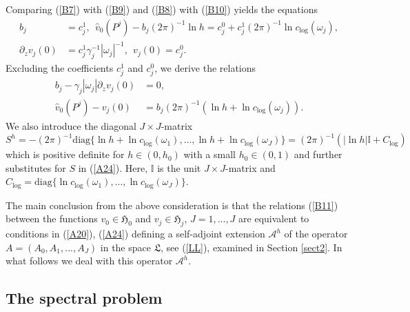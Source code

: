\documentclass[11pt]{article}%
\numberwithin{equation}{section}
\begin{document}
Comparing (\ref{B7}) with (\ref{B9}) and (\ref{B8}) with (\ref{B10}) yields
the equations%
\begin{align}
b_{j}  &  =c_{j}^{1},\ \ \widehat{v}_{0}(P^{j})-b_{j}(2\pi)^{-1}\ln
h=c_{j}^{0}+c_{j}^{1}(2\pi)^{-1}\ln c_{\log}\left(  \omega_{j}\right)
,\label{BBB}\\
\partial_{z}v_{j}(0)  &  =c_{j}^{1}\gamma_{j}^{-1}|\omega_{j}|^{-1}%
,\ \ v_{j}(0)=c_{j}^{0}.\nonumber
\end{align}
Excluding the coefficients $c_{j}^{1}$ and $c_{j}^{0}$, we derive the
relations%
\begin{align}
b_{j}-\gamma_{j}|\omega_{j}|\partial_{z}v_{j}(0)  &  =0,\label{B11}\\
\widehat{v}_{0}(P^{j})-v_{j}(0)  &  =b_{j}(2\pi)^{-1}(\ln h+\ln c_{\log
}\left(  \omega_{j}\right)  ).\nonumber
\end{align}
We also introduce the diagonal $J\times J$-matrix%
\begin{equation}
S^{h}=-(2\pi)^{-1}\mathrm{diag}\{\ln h+\ln c_{\log}\left(  \omega_{1}\right)
,...,\ln h+\ln c_{\log}\left(  \omega_{J}\right)  \}=(2\pi)^{-1}(|\ln
h|\mathbb{I}+C_{\log}) \label{B12}%
\end{equation}
which is positive definite for $h\in(0,h_{0})$ with a small $h_{0}\in(0,1)$
and further substitutes for $S$ in (\ref{A24}). Here, $\mathbb{I}$ is the unit
$J\times J$-matrix and $C_{\log}=\mathrm{diag}\{\ln c_{\log}\left(  \omega
_{1}\right)  ,...,\ln c_{\log}\left(  \omega_{J}\right)  \}$.

The main conclusion from the above consideration is that the relations
(\ref{B11}) between the functions $v_{0}\in\mathfrak{H}_{0}$ and $v_{j}%
\in\mathfrak{H}_{j}$, $J=1,...,J$ are equivalent to conditions in (\ref{A20}),
(\ref{A24}) defining a self-adjoint extension $\mathcal{A}^{h}$ of the
operator $A=(A_{0},A_{1},...,A_{J})$ in the space $\mathfrak{L}$, see
(\ref{LL}), examined in Section \ref{sect2}. In what follows we deal with this
operator $\mathcal{A}^{h}$.

\subsection{The spectral problem\label{sect3.3}}
\end{document}
